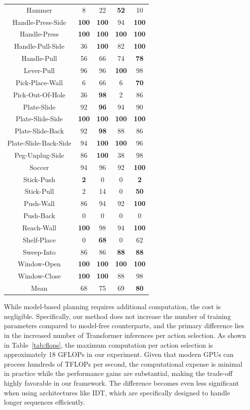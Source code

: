 \documentclass{article}
\begin{document}
\begin{table}[h]
\begin{tabular}{ccccc}
    Hammer & 8 & 22 & \textbf{52} & 10\\
    Handle-Press-Side & \textbf{100} & \textbf{100} & 94 & \textbf{100}\\
    Handle-Press & \textbf{100} & \textbf{100} & \textbf{100} & \textbf{100}\\
    Handle-Pull-Side & 36 & \textbf{100} & 82 & \textbf{100}\\
    Handle-Pull & 56 & 66 & 74 & \textbf{78}\\
    Lever-Pull & 96 & 96 & \textbf{100} & 98\\
    Pick-Place-Wall & 6 & 66 & 6 & \textbf{70}\\
    Pick-Out-Of-Hole & 36 & \textbf{98} & 2 & 86\\
    Plate-Slide & 92 & \textbf{96} & 94 & 90\\
    Plate-Slide-Side & \textbf{100} & \textbf{100} & \textbf{100} & \textbf{100}\\
    Plate-Slide-Back & 92 & \textbf{98} & 88 & 86\\
    Plate-Slide-Back-Side & 94 & \textbf{100} & \textbf{100} & 96\\
    Peg-Unplug-Side & 86 & \textbf{100} & 38 & 98\\
    Soccer & 94 & 96 & 92 & \textbf{100}\\
    Stick-Push & \textbf{2} & 0 & 0 & \textbf{2}\\
    Stick-Pull & 2 & 14 & 0 & \textbf{50}\\
    Push-Wall & 86 & 94 & 92 & \textbf{100}\\
    Push-Back & 0 & 0 & 0 & 0\\
    Reach-Wall & \textbf{100} & 98 & 94 & \textbf{100}\\
    Shelf-Place & 0 & \textbf{68} & 0 & 62\\
    Sweep-Into & 86 & 86 & \textbf{88} & \textbf{88}\\
    Window-Open & \textbf{100} & \textbf{100} & \textbf{100} & \textbf{100}\\
    Window-Close & \textbf{100} & \textbf{100} & 88 & 98\\
    \midrule
    Mean & 68 & 75 & 69 & \textbf{80}\\
    \bottomrule
    \end{tabular}
\end{table}

While model-based planning requires additional computation, the cost is negligible.
Specifically, our method does not increase the number of training parameters compared to model-free counterparts, and the primary difference lies in the increased number of Transformer inferences per action selection.
As shown in Table~\ref{tab:flops}, the maximum computation per action selection is approximately 18 GFLOPs in our experiment.
Given that modern GPUs can process hundreds of TFLOPs per second, the computational expense is minimal in practice while the performance gains are substantial, making the trade-off highly favorable in our framework.
The difference becomes even less significant when using architectures like IDT, which are specifically designed to handle longer sequences efficiently.
\end{document}
